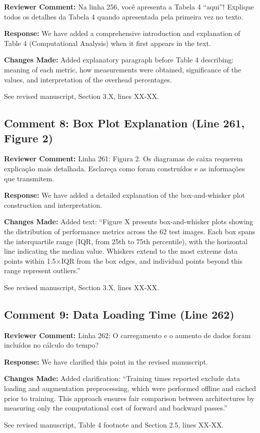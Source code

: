 \documentclass[11pt]{article}
\newcommand{\reviewercomment}[1]{\textcolor{reviewercolor}{\textbf{Reviewer Comment:} #1}}
\newcommand{\response}[1]{\textcolor{responsecolor}{\textbf{Response:} #1}}
\newcommand{\change}[1]{\textcolor{changecolor}{\textbf{Changes Made:} #1}}
\begin{document}
\reviewercomment{Na linha 256, você apresenta a Tabela 4 ``aqui''! Explique todos os detalhes da Tabela 4 quando apresentada pela primeira vez no texto.}

\response{We have added a comprehensive introduction and explanation of Table 4 (Computational Analysis) when it first appears in the text.}

\change{Added explanatory paragraph before Table 4 describing: meaning of each metric, how measurements were obtained, significance of the values, and interpretation of the overhead percentages.

See revised manuscript, Section 3.X, lines XX-XX.}

\subsection{Comment 8: Box Plot Explanation (Line 261, Figure 2)}

\reviewercomment{Linha 261: Figura 2. Os diagramas de caixa requerem explicação mais detalhada. Esclareça como foram construídos e as informações que transmitem.}

\response{We have added a detailed explanation of the box-and-whisker plot construction and interpretation.}

\change{Added text: ``Figure X presents box-and-whisker plots showing the distribution of performance metrics across the 62 test images. Each box spans the interquartile range (IQR, from 25th to 75th percentile), with the horizontal line indicating the median value. Whiskers extend to the most extreme data points within 1.5×IQR from the box edges, and individual points beyond this range represent outliers.''

See revised manuscript, Section 3.X, lines XX-XX.}

\subsection{Comment 9: Data Loading Time (Line 262)}

\reviewercomment{Linha 262: O carregamento e o aumento de dados foram incluídos no cálculo do tempo?}

\response{We have clarified this point in the revised manuscript.}

\change{Added clarification: ``Training times reported exclude data loading and augmentation preprocessing, which were performed offline and cached prior to training. This approach ensures fair comparison between architectures by measuring only the computational cost of forward and backward passes.''

See revised manuscript, Table 4 footnote and Section 2.5, lines XX-XX.}
\end{document}
